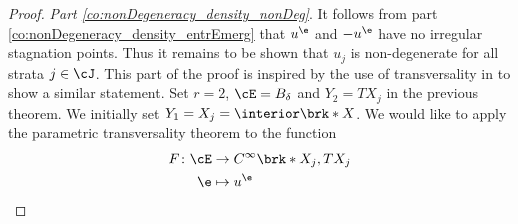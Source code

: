 \begin{proof}


  \emph{Part \ref{co:nonDegeneracy_density_nonDeg}}. 
  It follows from part \ref{co:nonDegeneracy_density_entrEmerg} that $u^\e$ and $-u^\e$ have no
  irregular stagnation points. Thus it remains to be shown that $u_j$ is non-degenerate for all strata $j\in\cJ$.
  This part of the proof is inspired by the use of transversality in \cite[§6 Theorem 1.2]{Hirsch1994} to show a similar statement.
  Set $r=2$, $\cE=B_\delta$ and $Y_2=TX_j$ in the previous theorem.
  We initially set $Y_1=X_j=\openX$.
  We would like to apply the parametric transversality theorem to the function
  \begin{align*}
    F\colon \cE&\to C^\infty\brk*{X_j,TX_j} \\
    \e&\mapsto u^\e
  \end{align*}

\end{proof}
